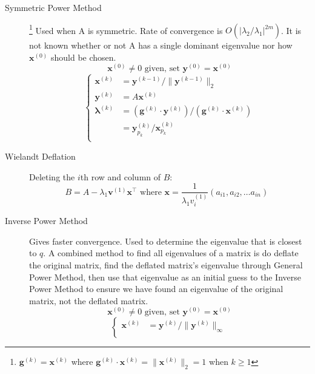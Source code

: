 \documentclass[8pt]{article}
\begin{document}
\begin{multicols}{2}
\begin{description}
  \item[Symmetric Power Method] \footnote{\label{ft:sympowmtd_g}$\mathbf{g}^{(k)} =
      \mathbf{x}^{(k)}$ where $\mathbf{g}^{(k)}\cdot\mathbf{x}^{(k)}=\|\mathbf{x}^{(k)}\|_2=1$ when
      $k \geq 1$} Used when A is symmetric. Rate of convergence is
    $O(|\lambda_2/\lambda_1|^{2m})$. It is not known whether or not A has a single dominant
    eigenvalue nor how $\mathbf{x}^{(0)}$ should be chosen.
    $$\mathbf{x}^{(0)} \neq 0 \text{ given, set } \mathbf{y}^{(0)}=\mathbf{x}^{(0)}$$
    \begin{equation*}
      \left\{
    \begin{aligned}
        \mathbf{x}^{(k)} &= \mathbf{y}^{(k-1)}/\|\mathbf{y}^{(k-1)}\|_2 \\
        \mathbf{y}^{(k)} &= A\mathbf{x}^{(k)} \\
        \boldsymbol{\lambda}^{(k)} &= (\mathbf{g}^{(k)} \cdot \mathbf{y}^{(k)})/(\mathbf{g}^{(k)} \cdot \mathbf{x}^{(k)}) \\
        &=\mathbf{y}^{(k)}_{p_k}/\mathbf{x}^{(k)}_{p_k} \\
      \end{aligned}
      \right.
    \end{equation*}
  \item[Wielandt Deflation] Deleting the $i$th row and column of $B$:
    \begin{equation*}
        B=A-\lambda_1\mathbf{v}^{(1)}\mathbf{x}^\top 
        \text{ where } \mathbf{x}=\frac{1}{\lambda_1 v^{(1)}_i}(a_{i1}, a_{i2}, \ldots a_{in}) 
        \text{ }
      \end{equation*}
    \item[Inverse Power Method] Gives faster convergence. Used to determine the eigenvalue that is
      closest to $q$. A combined method to find all eigenvalues of a matrix is do deflate the
      original matrix, find the deflated matrix's eigenvalue through General Power Method, then use
      that eigenvalue as an initial guess to the Inverse Power Method to ensure we have found an
      eigenvalue of the original matrix, not the deflated matrix.
    $$\mathbf{x}^{(0)} \neq 0 \text{ given, set } \mathbf{y}^{(0)}=\mathbf{x}^{(0)}$$
    \begin{equation*}
      \left\{
    \begin{aligned}
      \mathbf{x}^{(k)} &= \mathbf{y}^{(k)}/\|\mathbf{y}^{(k)}\|_\infty \\

\end{aligned}
\end{equation*}
\end{description}
\end{multicols}
\end{document}
